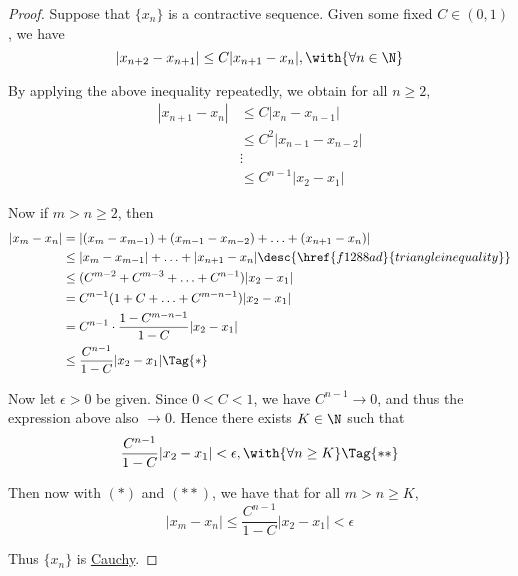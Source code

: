 \begin{proof}
  Suppose that $\{x_n\}$ is a contractive sequence. Given some fixed
  $C\in(0,1)$, we have
  $$
    |x_{n+2}-x_{n+1}|\leq C|x_{n+1}-x_n|,\with{\forall n\in\N}
  $$

  By applying the above inequality repeatedly, we obtain for all $n\geq2$,
  \begin{align*}
    |x_{n+1}-x_n| &\leq C|x_{n}-x_{n-1}|     \\
                  &\leq C^2|x_{n-1}-x_{n-2}| \\
                  &\vdots                    \\
                  &\leq C^{n-1}|x_2-x_1|
  \end{align*}

  Now if $m>n\geq2$, then
  \begin{align*}
    |x_{m}-x_{n}|
     &=|(x_{m}-x_{m-1})+(x_{m-1}-x_{m-2})+\ldots+(x_{n+1}-x_{n})|                          \\
     &\leq|x_{m}-x_{m-1}|+\ldots+|x_{n+1}-x_{n}|\desc{\href{f1288ad}{triangle inequality}} \\
     &\leq(C^{m-2}+C^{m-3}+\ldots+C^{n-1})|x_2-x_1|                                        \\
     &=C^{n-1}(1+C+\ldots+C^{m-n-1})|x_2-x_1|                                              \\
     &=C^{n-1}\cdot\frac{1-C^{m-n-1}}{1-C}|x_2-x_1|                                        \\
     &\leq\frac{C^{n-1}}{1-C}|x_2-x_1|\Tag{*}
  \end{align*}

  Now let $\epsilon>0$ be given. Since $0<C<1$, we have $C^{n-1}\to0$, and thus
  the expression above also $\to0$. Hence there exists $K\in\N$ such that
  \begin{equation*}
    \frac{C^{n-1}}{1-C}|x_2-x_1|<\epsilon,\with{\forall n\geq K}\Tag{**}
  \end{equation*}

  Then now with $(*)$ and $(**)$, we have that for all $m>n\geq K$,
  $$
    |x_{m}-x_{n}|\leq\frac{C^{n-1}}{1-C}|x_2-x_1|<\epsilon
  $$

  Thus $\{x_n\}$ is \href{a8f670d}{Cauchy}.
\end{proof}
